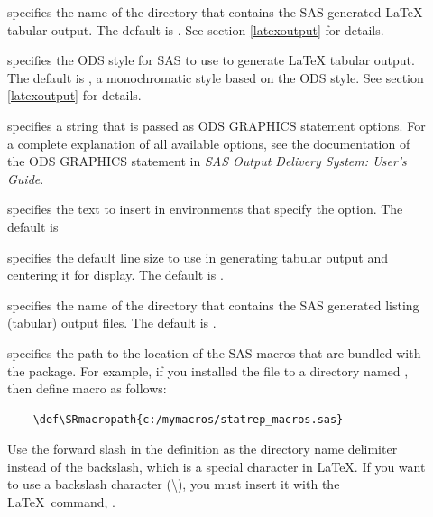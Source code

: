 \documentclass[article,oneside]{memoir}
\begin{document}
\begin{description}
    \item[] specifies the name of the directory that contains the
    SAS generated LaTeX tabular output. The default is .
    See section \ref{latexoutput} for details.

    \item[] specifies the ODS style for SAS to use to generate
    LaTeX tabular output. The default is , a monochromatic style based
    on the  ODS style.
    See section \ref{latexoutput} for details.

    \item[] specifies a string that is passed as
    ODS GRAPHICS statement options. For a complete explanation of all available options,
    see the documentation of the ODS GRAPHICS statement in
    \textit{SAS Output Delivery System: User's Guide}.

    \item[] specifies the text to insert in
     environments that specify
     the  option. The default is 

    \item[] specifies the default line size to use in generating tabular
    output and centering it for display. The default is .

     \item[] specifies the name of the directory that contains the SAS
     generated listing (tabular) output files. The default is .

     \item[] specifies the path to the location of the
     SAS macros that are bundled with the  package.
     For example, if  you installed the  file to a directory named
    ,
    then define macro  as follows:
    \begin{verbatim}
    \def\SRmacropath{c:/mymacros/statrep_macros.sas}
    \end{verbatim}

   Use the forward slash in the definition
   as the directory name delimiter instead of the backslash, which is a special
   character in \LaTeX. If you want to use a backslash character (\textbackslash), you
   must insert it with the \LaTeX\ command, .


\end{description}
\end{document}
